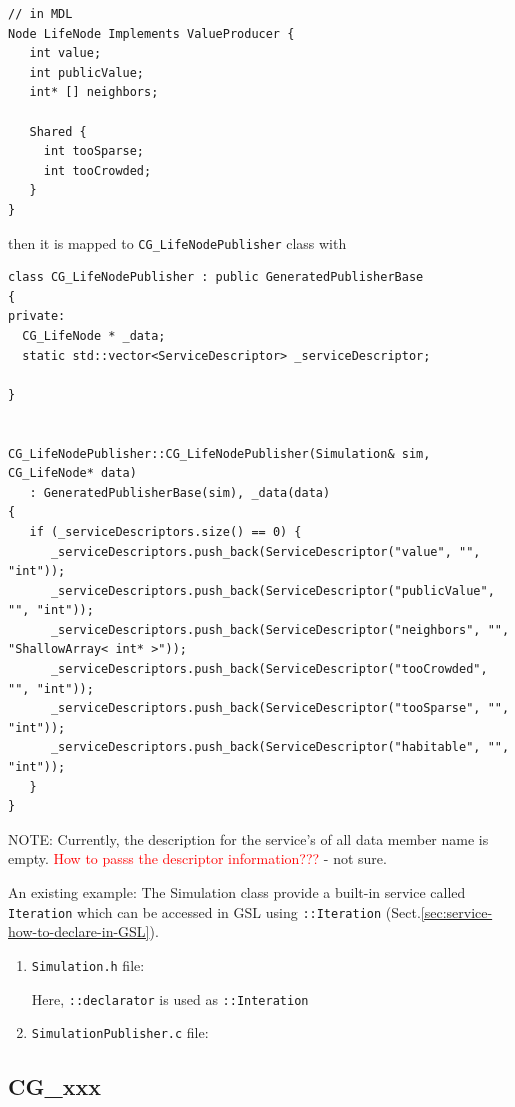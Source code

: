 \begin{verbatim}
// in MDL
Node LifeNode Implements ValueProducer {
   int value;
   int publicValue;
   int* [] neighbors;

   Shared {
     int tooSparse;
     int tooCrowded;
   }
}
\end{verbatim}

then it is mapped to \verb!CG_LifeNodePublisher! class with
{\tiny
\begin{lstlisting}
class CG_LifeNodePublisher : public GeneratedPublisherBase
{
private:
  CG_LifeNode * _data;
  static std::vector<ServiceDescriptor> _serviceDescriptor;

}


CG_LifeNodePublisher::CG_LifeNodePublisher(Simulation& sim, CG_LifeNode* data) 
   : GeneratedPublisherBase(sim), _data(data)
{
   if (_serviceDescriptors.size() == 0) {
      _serviceDescriptors.push_back(ServiceDescriptor("value", "", "int"));
      _serviceDescriptors.push_back(ServiceDescriptor("publicValue", "", "int"));
      _serviceDescriptors.push_back(ServiceDescriptor("neighbors", "", "ShallowArray< int* >"));
      _serviceDescriptors.push_back(ServiceDescriptor("tooCrowded", "", "int"));
      _serviceDescriptors.push_back(ServiceDescriptor("tooSparse", "", "int"));
      _serviceDescriptors.push_back(ServiceDescriptor("habitable", "", "int"));
   }
}
\end{lstlisting}
}

NOTE: Currently, the description for the service's of all data member name is
empty. \textcolor{red}{How to passs the descriptor information???} - not sure. 

An existing example: The Simulation class provide a built-in service called
\verb!Iteration! which can be accessed in GSL using \verb!::Iteration!
(Sect.\ref{sec:service-how-to-declare-in-GSL}).

\begin{enumerate}
  \item \verb!Simulation.h! file: 
  
Here, \verb!::declarator! is used as \verb!::Interation!
  
  
  \item \verb!SimulationPublisher.c! file: 
\end{enumerate}

\subsection{CG\_xxx}
\label{sec:CG_xxx}


